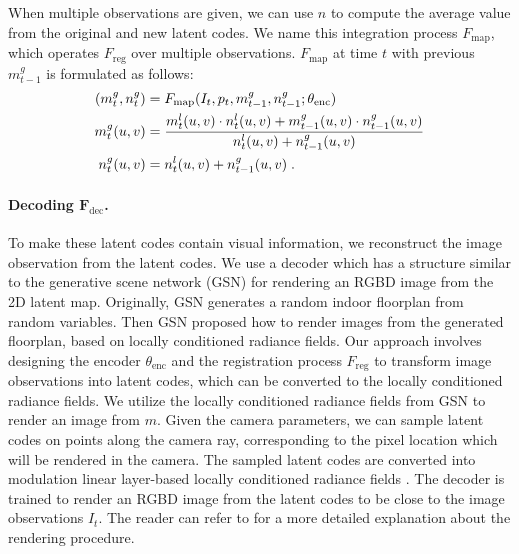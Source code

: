 \documentclass[10pt,twocolumn,letterpaper]{article}
\begin{document}
%
%
%
When multiple observations are given, we can use $n$ to compute the average value from the original and new latent codes.
%
We name this integration process $F_\mathrm{map}$, which operates $F_\mathrm{reg}$ over multiple observations.
%
$F_\mathrm{map}$ at time $t$ with previous $m^g_{t-1}$ is formulated as follows:
\begin{equation} \label{eq:F_map}
\begin{split}
    (m^g_t, n^g_t) &= F_\mathrm{map}(I_t, p_t, m^g_{t-1}, n^g_{t-1}; \theta_\mathrm{enc}) \\
    m^g_{t}(u,v) &= {{m^l_{t}(u,v) \cdot n^l_{t}(u,v) + m^g_{t-1}(u,v) \cdot n^g_{t-1}(u,v)}\over{n^l_t(u,v) + n^g_{t-1}(u,v)}} \\
    n^g_{t}(u,v) &= n^l_t(u,v) + n^g_{t-1}(u,v) \;.
\end{split}
\end{equation}


\vspace{-0.8cm}
\paragraph{Decoding $\mathbf{F_\mathrm{dec}}$.}
To make these latent codes contain visual information, we reconstruct the image observation from the latent codes.
%
We use a decoder which has a structure similar to the generative scene network (GSN) \cite{GSN} for rendering an RGBD image from the 2D latent map.
%
Originally, GSN generates a random indoor floorplan from random variables. 
%
Then GSN proposed how to render images from the generated floorplan, based on locally conditioned radiance fields. 
%
Our approach involves designing the encoder $\theta_\mathrm{enc}$ and the registration process $F_\mathrm{reg}$ to transform image observations into latent codes, which can be converted to the locally conditioned radiance fields. 
%
We utilize the locally conditioned radiance fields from GSN to render an image from $m$.
%
Given the camera parameters, we can sample latent codes on points along the camera ray, corresponding to the pixel location which will be rendered in the camera.
The sampled latent codes are converted into modulation linear layer-based locally conditioned radiance fields \cite{CIPS, GSN}.
%
The decoder is trained to render an RGBD image from the latent codes to be close to the image observations $I_t$. 
%
The reader can refer to \cite{GSN} for a more detailed explanation about the rendering procedure. 
%
\end{document}
